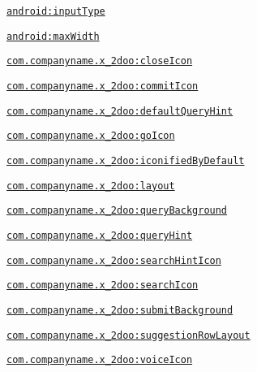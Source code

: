 {\tt \hyperlink{classandroid_1_1support_1_1v4_1_1_r_1_1styleable_b8d1739250c6edeea1c7639b77701e8a}{android:inputType}}

{\tt \hyperlink{classandroid_1_1support_1_1v4_1_1_r_1_1styleable_a7408a4cb904af448f8138e31449f9aa}{android:maxWidth}}

{\tt \hyperlink{classandroid_1_1support_1_1v4_1_1_r_1_1styleable_604e593d78318f98842bc75b6f058c85}{com.companyname.x\_\-2doo:closeIcon}}

{\tt \hyperlink{classandroid_1_1support_1_1v4_1_1_r_1_1styleable_7596f400f76fad60028392a5d9d8e462}{com.companyname.x\_\-2doo:commitIcon}}

{\tt \hyperlink{classandroid_1_1support_1_1v4_1_1_r_1_1styleable_269652287752b5c18c19cdf2cf0aeb52}{com.companyname.x\_\-2doo:defaultQueryHint}}

{\tt \hyperlink{classandroid_1_1support_1_1v4_1_1_r_1_1styleable_90f7086fb0866e78b77259eb32289c59}{com.companyname.x\_\-2doo:goIcon}}

{\tt \hyperlink{classandroid_1_1support_1_1v4_1_1_r_1_1styleable_082b54398657d1cdbea56322bf7c5e7f}{com.companyname.x\_\-2doo:iconifiedByDefault}}

{\tt \hyperlink{classandroid_1_1support_1_1v4_1_1_r_1_1styleable_70f15e7a0ccd231aa82768bfe48b1fec}{com.companyname.x\_\-2doo:layout}}

{\tt \hyperlink{classandroid_1_1support_1_1v4_1_1_r_1_1styleable_9edc86d9cbb248a65311249ed4ca415c}{com.companyname.x\_\-2doo:queryBackground}}

{\tt \hyperlink{classandroid_1_1support_1_1v4_1_1_r_1_1styleable_f0192b0ba88140e41e2b0f9db1bb970a}{com.companyname.x\_\-2doo:queryHint}}

{\tt \hyperlink{classandroid_1_1support_1_1v4_1_1_r_1_1styleable_4067485964152ef1a1eb4f8bf0d25188}{com.companyname.x\_\-2doo:searchHintIcon}}

{\tt \hyperlink{classandroid_1_1support_1_1v4_1_1_r_1_1styleable_2e407a80c6bca332a7b5c0632369c9dd}{com.companyname.x\_\-2doo:searchIcon}}

{\tt \hyperlink{classandroid_1_1support_1_1v4_1_1_r_1_1styleable_699aa92aa27e99d69cc974bc01481aea}{com.companyname.x\_\-2doo:submitBackground}}

{\tt \hyperlink{classandroid_1_1support_1_1v4_1_1_r_1_1styleable_603a0727c95352880049f37bb9b130ed}{com.companyname.x\_\-2doo:suggestionRowLayout}}

{\tt \hyperlink{classandroid_1_1support_1_1v4_1_1_r_1_1styleable_9e4c859282f5e9607d3b5ed4f4748148}{com.companyname.x\_\-2doo:voiceIcon}}

